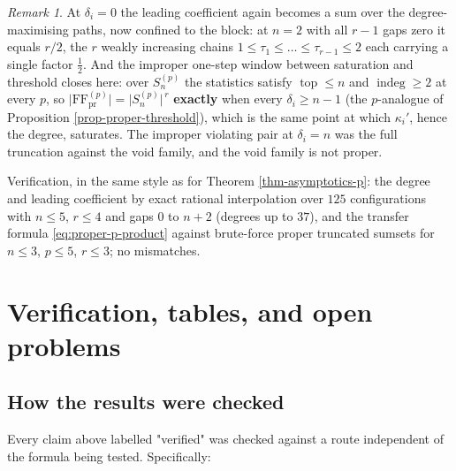 \documentclass[11pt, a4paper, abstract=yes]{scrartcl}
\theoremstyle{definition}
\theoremstyle{remark}
\newtheorem{remark}[definition]{Remark}
\theoremstyle{plain}
\newcommand{\indeg}{\operatorname{indeg}}
\newcommand{\tp}{\operatorname{top}}
\begin{document}
\begin{remark}
At \(\delta_i=0\) the leading coefficient again becomes a sum over the degree-maximising paths,
now confined to the block: at \(n=2\) with all \(r-1\) gaps zero it equals \(r/2\), the \(r\)
weakly increasing chains \(1\le\tau_1\le\dots\le\tau_{r-1}\le2\) each carrying a single factor
\(\tfrac12\). And the improper one-step window between saturation and threshold closes here: over
\(S_n^{(p)}\) the statistics satisfy \(\tp\le n\) and \(\indeg\ge2\) at every \(p\), so
\(\lvert\mathrm{FF}^{(p)}_{\mathrm{pr}}\rvert=\lvert S_n^{(p)}\rvert^{\,r}\) \textbf{exactly} when every
\(\delta_i\ge n-1\) (the \(p\)-analogue of Proposition \ref{prop-proper-threshold}), which is the
same point at which \(\kappa_i'\), hence the degree, saturates. The improper violating pair at
\(\delta_i=n\) was the full truncation against the void family, and the void family is not proper.

Verification, in the same style as for Theorem \ref{thm-asymptotics-p}: the degree and leading
coefficient by exact rational interpolation over \(125\) configurations with \(n\le5\), \(r\le4\)
and gaps \(0\) to \(n+2\) (degrees up to \(37\)), and the transfer formula
\eqref{eq:proper-p-product} against brute-force proper truncated sumsets for \(n\le3\), \(p\le5\),
\(r\le3\); no mismatches.
\label{rem-proper-p}
\end{remark}
\section{Verification, tables, and open problems}
\label{sec-verification}
\subsection{How the results were checked}
\label{sec:orgf77a9e1}

Every claim above labelled "verified" was checked against a route independent of the formula being
tested. Specifically:
\end{document}
